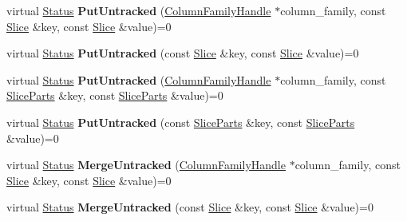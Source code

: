 \begin{DoxyCompactItemize}
\item 
virtual \hyperlink{classrocksdb_1_1Status}{Status} {\bfseries Put\+Untracked} (\hyperlink{classrocksdb_1_1ColumnFamilyHandle}{Column\+Family\+Handle} $\ast$column\+\_\+family, const \hyperlink{classrocksdb_1_1Slice}{Slice} \&key, const \hyperlink{classrocksdb_1_1Slice}{Slice} \&value)=0\hypertarget{classrocksdb_1_1Transaction_ace11b95d18a4b03ee7786d13b59a7135}{}\label{classrocksdb_1_1Transaction_ace11b95d18a4b03ee7786d13b59a7135}

\item 
virtual \hyperlink{classrocksdb_1_1Status}{Status} {\bfseries Put\+Untracked} (const \hyperlink{classrocksdb_1_1Slice}{Slice} \&key, const \hyperlink{classrocksdb_1_1Slice}{Slice} \&value)=0\hypertarget{classrocksdb_1_1Transaction_a1409664a8bd11053ad16adbb7a9100ce}{}\label{classrocksdb_1_1Transaction_a1409664a8bd11053ad16adbb7a9100ce}

\item 
virtual \hyperlink{classrocksdb_1_1Status}{Status} {\bfseries Put\+Untracked} (\hyperlink{classrocksdb_1_1ColumnFamilyHandle}{Column\+Family\+Handle} $\ast$column\+\_\+family, const \hyperlink{structrocksdb_1_1SliceParts}{Slice\+Parts} \&key, const \hyperlink{structrocksdb_1_1SliceParts}{Slice\+Parts} \&value)=0\hypertarget{classrocksdb_1_1Transaction_a376fd1373ca040a9c494315817ee891a}{}\label{classrocksdb_1_1Transaction_a376fd1373ca040a9c494315817ee891a}

\item 
virtual \hyperlink{classrocksdb_1_1Status}{Status} {\bfseries Put\+Untracked} (const \hyperlink{structrocksdb_1_1SliceParts}{Slice\+Parts} \&key, const \hyperlink{structrocksdb_1_1SliceParts}{Slice\+Parts} \&value)=0\hypertarget{classrocksdb_1_1Transaction_ae3cd6ed843b44f1916b91a20c1681a79}{}\label{classrocksdb_1_1Transaction_ae3cd6ed843b44f1916b91a20c1681a79}

\item 
virtual \hyperlink{classrocksdb_1_1Status}{Status} {\bfseries Merge\+Untracked} (\hyperlink{classrocksdb_1_1ColumnFamilyHandle}{Column\+Family\+Handle} $\ast$column\+\_\+family, const \hyperlink{classrocksdb_1_1Slice}{Slice} \&key, const \hyperlink{classrocksdb_1_1Slice}{Slice} \&value)=0\hypertarget{classrocksdb_1_1Transaction_afca03747b646bf6102195ad8a259c6b1}{}\label{classrocksdb_1_1Transaction_afca03747b646bf6102195ad8a259c6b1}

\item 
virtual \hyperlink{classrocksdb_1_1Status}{Status} {\bfseries Merge\+Untracked} (const \hyperlink{classrocksdb_1_1Slice}{Slice} \&key, const \hyperlink{classrocksdb_1_1Slice}{Slice} \&value)=0\hypertarget{classrocksdb_1_1Transaction_a8bef0bee4b99c98f2e639a87452aec2b}{}\label{classrocksdb_1_1Transaction_a8bef0bee4b99c98f2e639a87452aec2b}


\end{DoxyCompactItemize}
